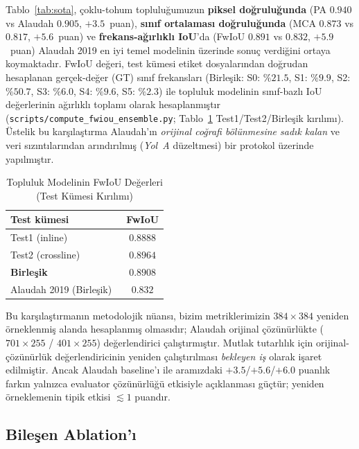 \documentclass[conference,a4paper,10pt]{IEEEtran}
\begin{document}
Tablo~\ref{tab:sota}, çoklu-tohum topluluğumuzun \textbf{piksel doğruluğunda}
(PA $0.940$ vs Alaudah $0.905$, $+3.5$~puan), \textbf{sınıf ortalaması
doğruluğunda} (MCA $0.873$ vs $0.817$, $+5.6$~puan) ve \textbf{frekans-ağırlıklı
IoU}’da (FwIoU $0.891$ vs $0.832$, $+5.9$~puan) Alaudah 2019 en iyi
temel modelinin üzerinde sonuç verdiğini ortaya koymaktadır. FwIoU değeri,
test kümesi etiket dosyalarından doğrudan hesaplanan gerçek-değer (GT) sınıf
frekansları (Birleşik: S0: $\%21.5$, S1: $\%9.9$, S2: $\%50.7$, S3: $\%6.0$,
S4: $\%9.6$, S5: $\%2.3$) ile topluluk modelinin sınıf-bazlı IoU değerlerinin
ağırlıklı toplamı olarak hesaplanmıştır
(\texttt{scripts/compute\_fwiou\_ensemble.py}; Tablo~\ref{tab:fwiou_split}
Test1/Test2/Birleşik kırılımı). Üstelik bu karşılaştırma Alaudah'ın
\emph{orijinal coğrafi bölünmesine sadık kalan} ve veri sızıntılarından
arındırılmış (\emph{Yol~A} düzeltmesi) bir protokol üzerinde yapılmıştır.

\begin{table}[!t]
\renewcommand{\arraystretch}{1.2}
\caption{Topluluk Modelinin FwIoU Değerleri (Test Kümesi Kırılımı)}
\label{tab:fwiou_split}
\centering
\begin{tabular}{lc}
\toprule
\textbf{Test kümesi} & \textbf{FwIoU} \\
\midrule
Test1 (inline)    & $0.8888$ \\
Test2 (crossline) & $0.8964$ \\
\textbf{Birleşik} & $\mathbf{0.8908}$ \\
\midrule
Alaudah 2019 (Birleşik)~\cite{alaudah2019} & $0.832$ \\
\bottomrule
\end{tabular}
\end{table}

Bu karşılaştırmanın metodolojik nüansı, bizim metriklerimizin $384 \times 384$
yeniden örneklenmiş alanda hesaplanmış olmasıdır; Alaudah orijinal çözünürlükte
($701 \times 255$ / $401 \times 255$) değerlendirici çalıştırmıştır. Mutlak
tutarlılık için orijinal-çözünürlük değerlendiricinin yeniden çalıştırılması
\emph{bekleyen iş} olarak işaret edilmiştir. Ancak Alaudah baseline’ı ile
aramızdaki $+3.5$/$+5.6$/$+6.0$ puanlık farkın yalnızca evaluator çözünürlüğü
etkisiyle açıklanması güçtür; yeniden örneklemenin tipik etkisi $\lesssim 1$
puandır.

\subsection{Bileşen Ablation'ı}
\label{sec:ablation}
\end{document}
